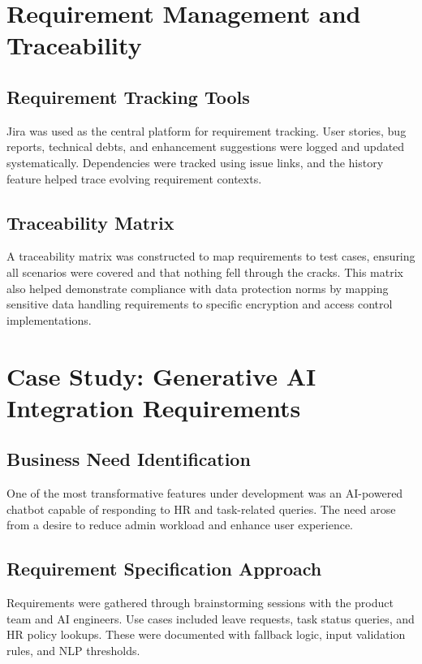 \section{Requirement Management and Traceability}

\subsection{Requirement Tracking Tools}

Jira was used as the central platform for requirement tracking. User stories, bug reports, technical debts, and enhancement suggestions were logged and updated systematically. Dependencies were tracked using issue links, and the history feature helped trace evolving requirement contexts.

\subsection{Traceability Matrix}

A traceability matrix was constructed to map requirements to test cases, ensuring all scenarios were covered and that nothing fell through the cracks. This matrix also helped demonstrate compliance with data protection norms by mapping sensitive data handling requirements to specific encryption and access control implementations.

\section{Case Study: Generative AI Integration Requirements}

\subsection{Business Need Identification}

One of the most transformative features under development was an AI-powered chatbot capable of responding to HR and task-related queries. The need arose from a desire to reduce admin workload and enhance user experience.

\subsection{Requirement Specification Approach}

Requirements were gathered through brainstorming sessions with the product team and AI engineers. Use cases included leave requests, task status queries, and HR policy lookups. These were documented with fallback logic, input validation rules, and NLP thresholds.

